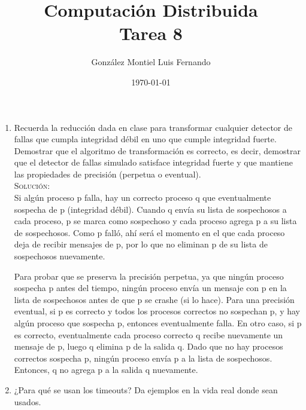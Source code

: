 \documentclass[letterpaper,10pt]{article}
\title{Computación Distribuida \\ Tarea 8}
\author{González Montiel Luis Fernando \\}
\date{\today}
\begin{document}
\maketitle

	\begin{enumerate}

    \item Recuerda la reducción dada en clase para transformar cualquier detector de fallas que cumpla integridad débil en uno que cumple integridad fuerte.
Demostrar que el algoritmo de transformación es correcto, es decir, demostrar que el detector de fallas simulado satisface integridad fuerte y que mantiene las propiedades de precisión (perpetua o eventual).\\
   
    \textsc{Solución:}
    \\  
    Si algún proceso p falla, hay un correcto proceso q que eventualmente sospecha de p (integridad débil). Cuando q envía su lista de sospechosos a cada proceso, p se marca como sospechoso y cada proceso agrega p a su lista de sospechosos. Como p falló, ahí será el momento en el que cada proceso deja de recibir mensajes de p, por lo que no eliminan p de su lista de sospechosos nuevamente.

Para probar que se preserva la precisión perpetua, ya que ningún proceso sospecha p antes del tiempo, ningún proceso envía un mensaje con p en la lista de sospechosos antes de que p se crashe (si lo hace). Para una precisión eventual, si p es correcto y todos los procesos correctos no sospechan p, y hay algún proceso que sospecha p, entonces eventualmente falla. En otro caso, si p es correcto, eventualmente cada proceso correcto q recibe nuevamente un mensaje de p, luego q elimina p de la salida q. Dado que no hay procesos correctos sospecha p, ningún proceso envía p a la lista de sospechosos. Entonces, q no agrega p a la salida q nuevamente.

    \item ¿Para qué se usan los timeouts? Da ejemplos en la vida real donde sean usados.\\
    \begin{lstlisting}
   
		\end{lstlisting}
   

\end{enumerate}
\end{document}

